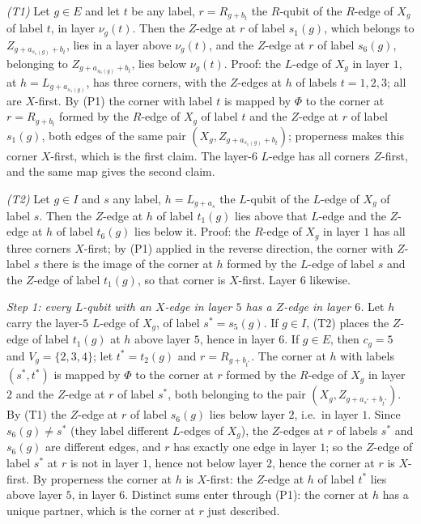 \documentclass[reprint,twocolumn,superscriptaddress,nofootinbib]{revtex4-2}
\theoremstyle{plain}
\begin{document}
\emph{(T1)} Let $g\in E$ and let $t$ be any label, $r=R_{g+b_t}$ the
$R$-qubit of the $R$-edge of $X_g$ of label $t$, in layer $\nu_g(t)$.
Then the $Z$-edge at $r$ of label $s_1(g)$, which belongs to
$Z_{g+a_{s_1(g)}+b_t}$, lies in a layer above $\nu_g(t)$, and the
$Z$-edge at $r$ of label $s_6(g)$, belonging to $Z_{g+a_{s_6(g)}+b_t}$,
lies below $\nu_g(t)$. Proof: the $L$-edge of $X_g$ in layer $1$, at
$h=L_{g+a_{s_1(g)}}$, has three corners, with the $Z$-edges at $h$ of
labels $t=1,2,3$; all are $X$-first. By (P1) the corner with label $t$
is mapped by $\Phi$ to the corner at $r=R_{g+b_t}$ formed by the $R$-edge
of $X_g$ of label $t$ and the $Z$-edge at $r$ of label $s_1(g)$, both
edges of the same pair $(X_g,Z_{g+a_{s_1(g)}+b_t})$; properness makes
this corner $X$-first, which is the first claim. The layer-$6$ $L$-edge
has all corners $Z$-first, and the same map gives the second claim.

\emph{(T2)} Let $g\in I$ and $s$ any label, $h=L_{g+a_s}$ the $L$-qubit
of the $L$-edge of $X_g$ of label $s$. Then the $Z$-edge at $h$ of label
$t_1(g)$ lies above that $L$-edge and the $Z$-edge at $h$ of label
$t_6(g)$ lies below it. Proof: the $R$-edge of $X_g$ in layer $1$ has
all three corners $X$-first; by (P1) applied in the reverse direction,
the corner with $Z$-label $s$ there is the image of the corner at $h$
formed by the $L$-edge of label $s$ and the $Z$-edge of label $t_1(g)$,
so that corner is $X$-first. Layer $6$ likewise.

\emph{Step 1: every $L$-qubit with an $X$-edge in layer $5$ has a
$Z$-edge in layer $6$.} Let $h$ carry the layer-$5$ $L$-edge of $X_g$,
of label $s^\ast=s_5(g)$. If $g\in I$, (T2) places the $Z$-edge of label
$t_1(g)$ at $h$ above layer $5$, hence in layer $6$. If $g\in E$, then
$c_g=5$ and $V_g=\{2,3,4\}$; let $t^\ast=t_2(g)$ and $r=R_{g+b_{t^\ast}}$.
The corner at $h$ with labels $(s^\ast,t^\ast)$ is mapped by $\Phi$ to the
corner at $r$ formed by the $R$-edge of $X_g$ in layer $2$ and the
$Z$-edge at $r$ of label $s^\ast$, both belonging to the pair
$(X_g,Z_{g+a_{s^\ast}+b_{t^\ast}})$. By (T1) the $Z$-edge at $r$ of label
$s_6(g)$ lies below layer $2$, i.e.\ in layer $1$. Since $s_6(g)\neq
s^\ast$ (they label different $L$-edges of $X_g$), the $Z$-edges at $r$
of labels $s^\ast$ and $s_6(g)$ are different edges, and $r$ has exactly
one edge in layer $1$; so the $Z$-edge of label $s^\ast$ at $r$ is not in
layer $1$, hence not below layer $2$, hence the corner at $r$ is
$X$-first. By properness the corner at $h$ is $X$-first: the $Z$-edge at
$h$ of label $t^\ast$ lies above layer $5$, in layer $6$. Distinct sums
enter through (P1): the corner at $h$ has a unique partner, which is the
corner at $r$ just described.
\end{document}
